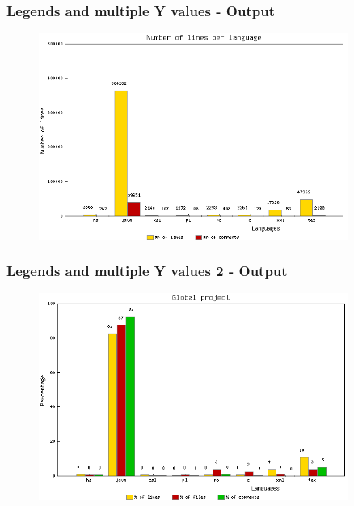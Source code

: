 \documentclass{beamer}
\begin{document}
\begin{frame}[fragile] \frametitle{Legends and multiple Y values - Output}
\begin{figure}[htbp]
\begin{center}
\includegraphics[width=0.9\textwidth]{image/msc_LinesPerLanguage.png}
\end{center}
\end{figure}
\end{frame}

\begin{frame}[fragile] \frametitle{Legends and multiple Y values 2 - Output}
\begin{figure}[htbp]
\begin{center}
\includegraphics[width=0.9\textwidth]{image/msc_projectLanguages.png}
\end{center}
\end{figure}
\end{frame}
\end{document}
